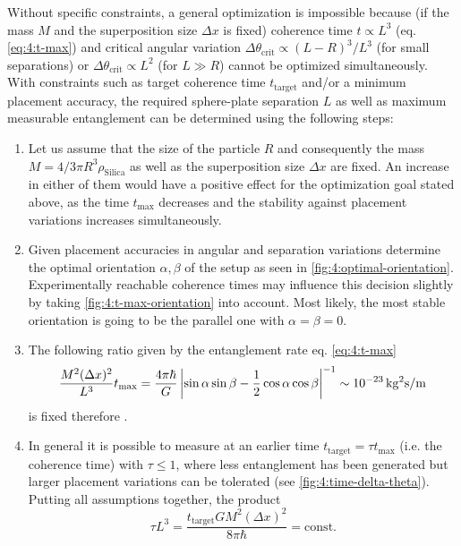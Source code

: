 Without specific constraints, a general optimization is impossible because (if the mass $M$ and the superposition size $\Delta x$ is fixed) coherence time $t \propto L^3$ (eq. \eqref{eq:4:t-max}) and critical angular variation $\Delta \theta_\mathrm{crit} \propto (L-R)^3/L^3$ (for small separations) or $\Delta \theta_\mathrm{crit} \propto L^2$ (for $L \gg R$) cannot be optimized simultaneously.
With constraints such as target coherence time $t_\mathrm{target}$ and/or a minimum placement accuracy, the required sphere-plate separation $L$ as well as maximum measurable entanglement can be determined using the following steps:
\begin{enumerate}
  \item Let us assume that the size of the particle $R$ and consequently the mass $M=4/3 \pi R^3 \rho_\mathrm{Silica}$ as well as the superposition size $\Delta x$ are fixed. An increase in either of them would have a positive effect for the optimization goal stated above, as the time $t_\mathrm{max}$ decreases and the stability against placement variations increases simultaneously.
  \item Given placement accuracies in angular and separation variations determine the optimal orientation $\alpha,\beta$ of the setup as seen in \cref{fig:4:optimal-orientation}. Experimentally reachable coherence times may influence this decision slightly by taking \cref{fig:4:t-max-orientation} into account. Most likely, the most stable orientation is going to be the parallel one with $\alpha = \beta = 0$.
  \item The following ratio given by the entanglement rate eq. \eqref{eq:4:t-max}
  \begin{equation}
    \frac{M^2 (\Delta x)^2}{L^3}t_\mathrm{max} = \frac{4 \pi \hbar}{G}\left\lvert\sin\alpha\sin\beta-\frac{1}{2}\cos\alpha\cos\beta\right\rvert^{-1} \sim 10^{-23} \, \mathrm{kg^2 s/m}
  \end{equation} 
  is fixed therefore \cite{Aspelmeyer_2024}.
  \item In general it is possible to measure at an earlier time $t_\mathrm{target} = \tau t_\mathrm{max}$ (i.e. the coherence time) with $\tau \leq 1$, where less entanglement has been generated but larger placement variations can be tolerated (see \cref{fig:4:time-delta-theta}). Putting all assumptions together, the product
  \begin{equation}\label{eq:4:fixed-ratio}
    \tau L^3 = \frac{t_\mathrm{target} G M^2 (\Delta x)^2}{8\pi \hbar} = \mathrm{const.}
  \end{equation}

\end{enumerate}
